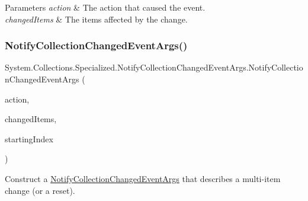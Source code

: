 \begin{DoxyParams}{Parameters}
{\em action} & The action that caused the event.\\
\hline
{\em changed\+Items} & The items affected by the change.\\
\hline
\end{DoxyParams}
\mbox{\label{class_system_1_1_collections_1_1_specialized_1_1_notify_collection_changed_event_args_a79327bb7bf3756166405b8f69ad73cc2}} 
\subsubsection{\texorpdfstring{Notify\+Collection\+Changed\+Event\+Args()}{NotifyCollectionChangedEventArgs()}\hspace{0.1cm}{\footnotesize\ttfamily [5/11]}}
{\footnotesize\ttfamily System.\+Collections.\+Specialized.\+Notify\+Collection\+Changed\+Event\+Args.\+Notify\+Collection\+Changed\+Event\+Args (\begin{DoxyParamCaption}\item[{\hyperlink{namespace_system_1_1_collections_1_1_specialized_a7e21ea761562ed22011c3120bbb31123}{Notify\+Collection\+Changed\+Action}}]{action,  }\item[{I\+List}]{changed\+Items,  }\item[{int}]{starting\+Index }\end{DoxyParamCaption})\hspace{0.3cm}{\ttfamily [inline]}}



Construct a \hyperlink{class_system_1_1_collections_1_1_specialized_1_1_notify_collection_changed_event_args}{Notify\+Collection\+Changed\+Event\+Args} that describes a multi-\/item change (or a reset). 


